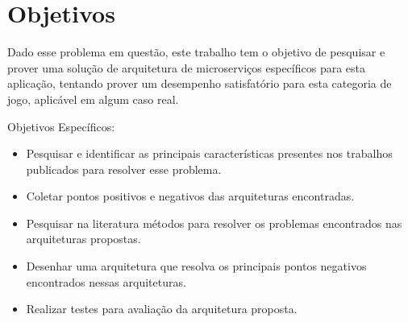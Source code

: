 \section{Objetivos}
\label{obj}

Dado esse problema em questão, este trabalho tem o objetivo de pesquisar e prover uma solução de arquitetura de microserviços específicos para esta aplicação, tentando prover um desempenho satisfatório para esta categoria de jogo, aplicável em algum caso real.

Objetivos Específicos:
\begin{itemize}
    \item Pesquisar e identificar as principais características presentes nos trabalhos publicados para resolver esse problema.
    \item Coletar pontos positivos e negativos das arquiteturas encontradas.
    \item Pesquisar na literatura métodos para resolver os problemas encontrados nas arquiteturas propostas.
    \item Desenhar uma arquitetura que resolva os principais pontos negativos encontrados nessas arquiteturas.
    \item Realizar testes para avaliação da arquitetura proposta.
\end{itemize}
